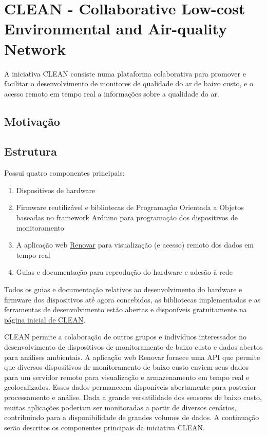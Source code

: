 \chapter{CLEAN - Collaborative Low-cost Environmental and Air-quality Network}\label{cap:clean-initiative}

A iniciativa CLEAN consiste numa plataforma colaborativa para promover e facilitar o desenvolvimento de monitores de qualidade do ar de baixo custo, e o acesso remoto em tempo real a informações sobre a qualidade do ar.

\section{Motivação}


\section{Estrutura}

Possui quatro componentes principais: 

\begin{enumerate}
    \item Dispositivos de hardware
    \item Firmware reutilizável e bibliotecas de Programação Orientada a Objetos baseadas no framework Arduino para programação dos dispositivos de monitoramento
    \item A aplicação web \href{http://renovar.lcqar.ufsc.br/}{Renovar} para visualização (e acesso) remoto dos dados em tempo real
    \item Guias e documentação para reprodução do hardware e adesão à rede
\end{enumerate}

Todos os guias e documentação relativos ao desenvolvimento do hardware e firmware dos dispositivos até agora concebidos, as bibliotecas implementadas e as ferramentas de desenvolvimento estão abertas e disponíveis gratuitamente na \href{https://lcqar.ufsc.br/novo/index.php/documentacao-clean/}{página inicial de CLEAN}.

CLEAN permite a colaboração de outros grupos e indivíduos interessados no desenvolvimento de dispositivos de monitoramento de baixo custo e dados abertos para análises ambientais. A aplicação web Renovar fornece uma API que permite que diversos dispositivos de monitoramento de baixo custo enviem seus dados para um servidor remoto para visualização e armazenamento em tempo real e geolocalizados. Esses dados permanecem disponíveis abertamente para posterior processamento e análise. Dada a grande versatilidade dos sensores de baixo custo, muitas aplicações poderiam ser monitoradas a partir de diversos cenários, contribuindo para a disponibilidade de grandes volumes de dados. A continuação serão descritos os componentes principais da iniciativa CLEAN.

